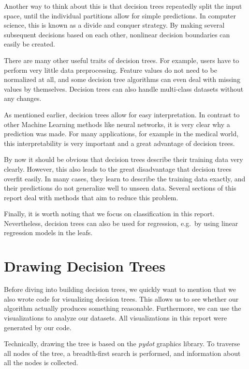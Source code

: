 \documentclass[a4paper]{article}
\begin{document}
Another way to think about this is that decision trees repeatedly split the input space, until the individual partitions allow for simple predictions. In computer science, this is known as a divide and conquer strategy. By making several subsequent decisions based on each other, nonlinear decision boundaries can easily be created.

There are many other useful traits of decision trees. For example, users have to perform very little data preprocessing. Feature values do not need to be normalized at all, and some decision tree algorithms can even deal with missing values by themselves. Decision trees can also handle multi-class datasets without any changes.

As mentioned earlier, decision trees allow for easy interpretation. In contrast to other Machine Learning methods like neural networks, it is very clear why a prediction was made. For many applications, for example in the medical world, this interpretability is very important and a great advantage of decision trees.

By now it should be obvious that decision trees describe their training data very clearly. However, this also leads to the great disadvantage that decision trees overfit easily. In many cases, they learn to describe the training data exactly, and their predictions do not generalize well to unseen data. Several sections of this report deal with methods that aim to reduce this problem.

Finally, it is worth noting that we focus on classification in this report. Nevertheless, decision trees can also be used for regression, e.g.\ by using linear regression models in the leafs.

\section{Drawing Decision Trees}

Before diving into building decision trees, we quickly want to mention that we also wrote code for visualizing decision trees. This allows us to see whether our algorithm actually produces something reasonable. Furthermore, we can use the visualizations to analyze our datasets. All visualizations in this report were generated by our code.

Technically, drawing the tree is based on the \emph{pydot} graphics library. To traverse all nodes of the tree, a breadth-first search is performed, and information about all the nodes is collected.
\end{document}
